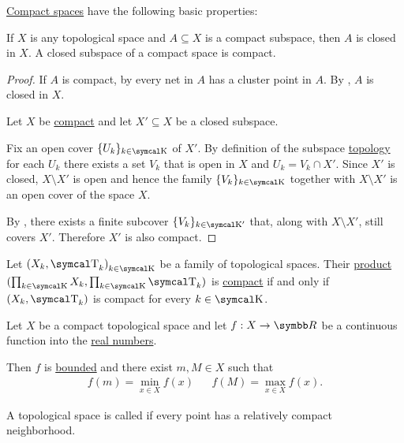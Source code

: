 \begin{proposition}\label{thm:compact_space_properties}
  \hyperref[def:compact_space]{Compact spaces} have the following basic properties:
  \begin{PropEnum}
     If \( X \) is any topological space and \( A \subseteq X \) is a compact subspace, then \( A \) is closed in \( X \).
     A closed subspace of a compact space is compact.
  \end{PropEnum}
\end{proposition}
\begin{proof}
   If \( A \) is compact, by  every net in \( A \) has a cluster point in \( A \). By , \( A \) is closed in \( X \).

   Let \( X \) be \hyperref[def:compact_space]{compact} and let \( X' \subseteq X \) be a closed subspace.

  Fix an open cover \( \{ U_k \}_{k \in \CK} \) of \( X' \). By definition of the subspace \hyperref[def:topological_subspace]{topology} for each \( U_k \) there exists a set \( V_k \) that is open in \( X \) and \( U_k = V_k \cap X' \). Since \( X' \) is closed, \( X \setminus X' \) is open and hence the family \( \{ V_k \}_{k \in \CK} \) together with \( X \setminus X' \) is an open cover of the space \( X \).

  By , there exists a finite subcover \( \{ V_k \}_{k \in \CK'} \) that, along with \( X \setminus X' \), still covers \( X' \). Therefore \( X' \) is also compact.
\end{proof}

\begin{theorem}\label{thm:tychonoffs_product_theorem}
  Let \( { (X_k, \CT_k) }_{k \in \CK} \) be a family of topological spaces. Their \hyperref[def:topological_product]{product} \( (\prod_{k \in \CK} X_k, \prod_{k \in \CK} \CT_k) \) is \hyperref[def:compact_space]{compact} if and only if \( (X_k, \CT_k) \) is compact for every \( k \in \CK \).
\end{theorem}

\begin{theorem}\label{thm:weierstrass_extreme_value_theorem}
  Let \( X \) be a compact topological space and let \( f: X \to \BR \) be a continuous function into the \hyperref[def:real_numbers]{real numbers}.

  Then \( f \) is \hyperref[def:metric_space/bounded_function]{bounded} and there exist \( m, M \in X \) such that
  \begin{align*}
    f(m) = \min_{x \in X} f(x)
     &  &
    f(M) = \max_{x \in X} f(x).
  \end{align*}
\end{theorem}

\begin{definition}\label{def:locally_compact_space}
  A topological space is called  if every point has a relatively compact neighborhood.
\end{definition}
